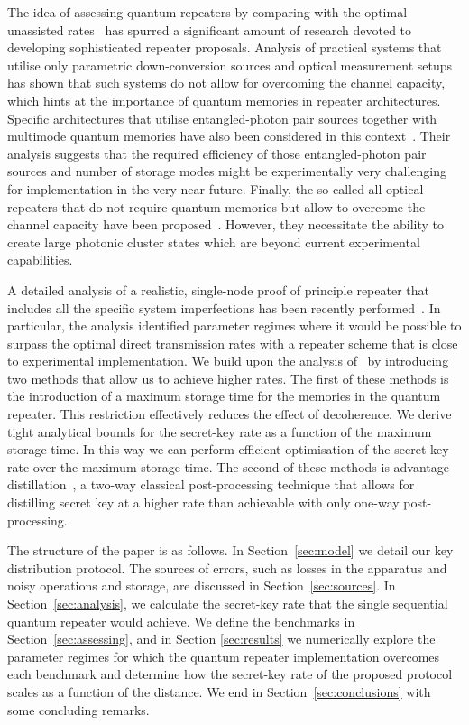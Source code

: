 \documentclass[aps,pra,reprint,superscriptaddress]{revtex4-1}
\begin{document}
The idea of assessing quantum repeaters by comparing with the optimal unassisted rates~\cite{takeoka2014fundamental, goodenough2016assessing, pirandola2015fundamental, wilde2016energy, Wilde:2016aa, pirandola2015general, christandl2016relative, bardhan2014strong} has spurred a significant amount of research devoted to developing sophisticated repeater proposals. Analysis of practical systems that utilise only parametric down-conversion sources and optical measurement setups~\cite{khalique2015practical} has shown that such systems do not allow for overcoming the channel capacity, which hints at the importance of quantum memories in repeater architectures. Specific architectures that utilise entangled-photon pair sources together with multimode quantum memories have also been considered in this context~\cite{guha2015rate, krovi_15}. Their analysis suggests that the required efficiency of those entangled-photon pair sources and number of storage modes might be experimentally very challenging for implementation in the very near future. Finally, the so called all-optical repeaters that do not require quantum memories but allow to overcome the channel capacity have been proposed~\cite{pant2017rate}. However, they necessitate the ability to create large photonic cluster states which are beyond current experimental capabilities.


A detailed analysis of a realistic, single-node proof of principle repeater that includes all the specific system imperfections has been recently performed~\cite{luong2015overcoming}. In particular, the analysis identified parameter regimes where it would be possible to surpass the optimal direct transmission rates with a repeater scheme that is close to experimental implementation.
We build upon the analysis of~\cite{luong2015overcoming} by introducing two methods that allow us to achieve higher rates. The first of these methods is the introduction of a maximum storage time for the memories in the quantum repeater. This restriction effectively reduces the effect of decoherence. We derive tight analytical bounds for the secret-key rate as a function of the maximum storage time. In this way we can perform efficient optimisation of the secret-key rate over the maximum storage time. The second of these methods is advantage distillation~\cite{gottesman2003proof}, a two-way classical post-processing technique that allows for distilling secret key at a higher rate than achievable with only one-way post-processing. 


The structure of the paper is as follows. In Section~\ref{sec:model} we detail our key distribution protocol. 
The sources of errors, such as losses in the apparatus and noisy operations and storage, are discussed in Section~\ref{sec:sources}. 
In Section~\ref{sec:analysis}, we calculate the secret-key rate that the single sequential quantum repeater would achieve. We define the benchmarks in Section~\ref{sec:assessing}, and in Section \ref{sec:results} we numerically explore the parameter regimes for which the quantum repeater implementation overcomes each benchmark and determine how the secret-key rate of the proposed protocol scales as a function of the distance. We end in Section~\ref{sec:conclusions} with some concluding remarks.
\end{document}
